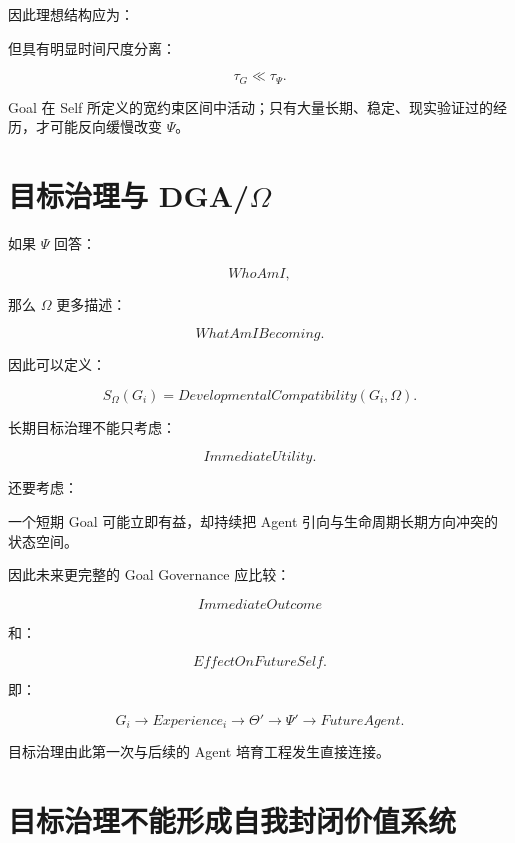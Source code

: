 \begin{statementbox}
\centering
{}
\end{statementbox}

因此理想结构应为：

\begin{statementbox}
\centering
{}
\end{statementbox}

但具有明显时间尺度分离：

\[
\tau_G
\ll
\tau_\Psi.
\]

Goal 在 Self 所定义的宽约束区间中活动；只有大量长期、稳定、现实验证过的经历，才可能反向缓慢改变 $\Psi$。


\section{目标治理与 DGA/$\Omega$}

如果 $\Psi$ 回答：

\[
WhoAmI,
\]

那么 $\Omega$ 更多描述：

\[
WhatAmIBecoming.
\]

因此可以定义：

\[
S_\Omega(G_i)
=
DevelopmentalCompatibility(G_i,\Omega).
\]

长期目标治理不能只考虑：

\[
ImmediateUtility.
\]

还要考虑：

\begin{statementbox}
\centering
{}
\end{statementbox}

一个短期 Goal 可能立即有益，却持续把 Agent 引向与生命周期长期方向冲突的状态空间。

因此未来更完整的 Goal Governance 应比较：

\[
ImmediateOutcome
\]

和：

\[
EffectOnFutureSelf.
\]

即：

\[
G_i
\rightarrow
Experience_i
\rightarrow
\Theta'
\rightarrow
\Psi'
\rightarrow
FutureAgent.
\]

目标治理由此第一次与后续的 Agent 培育工程发生直接连接。


\section{目标治理不能形成自我封闭价值系统}

